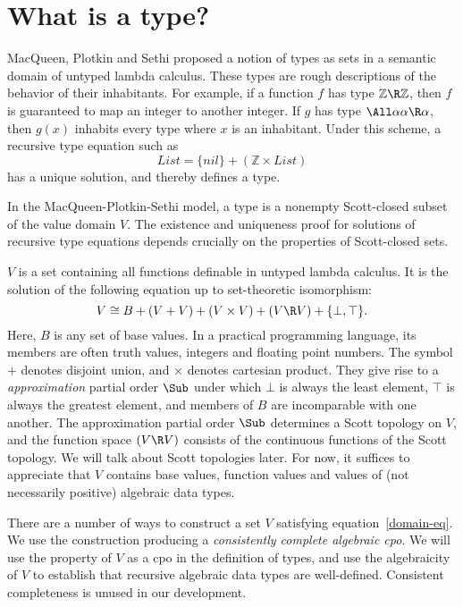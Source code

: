\appendix

\section{What is a type?}

MacQueen, Plotkin and Sethi proposed a notion of types as sets in
a semantic domain of untyped lambda calculus. These types are
rough descriptions of the behavior of their inhabitants. For
example, if a function $f$ has type $\mathbb Z\R\mathbb Z$, then
$f$ is guaranteed to map an integer to another integer. If $g$
has type $\All\alpha \alpha\R\alpha$, then $g(x)$ inhabits every
type where $x$ is an inhabitant. Under this scheme, a recursive
type equation such as
\[
\mathit{List} = \{\mathit{nil}\} + (\mathbb Z \times \mathit{List})
\]
has a unique solution, and thereby defines a type.

In the MacQueen-Plotkin-Sethi model, a type is a nonempty
Scott-closed subset of the value domain $V$. The existence and
uniqueness proof for solutions of recursive type equations
depends crucially on the properties of Scott-closed sets.



$V$ is a set containing all functions definable in untyped lambda
calculus. It is the solution of the following equation up to
set-theoretic isomorphism:
\begin{equation}\label{domain-eq}
V \cong B + (V + V) + (V \times V) + (V \R V) + \{\bot, \top\}.
\end{equation}
Here, $B$ is any set of base values. In a practical programming
language, its members are often truth values, integers and
floating point numbers. The symbol $+$ denotes disjoint union,
and $\times$ denotes cartesian product. They give rise to a
\emph{approximation} partial order $\Sub$ under which $\bot$ is
always the least element, $\top$ is always the greatest element,
and members of $B$ are incomparable with one another. The
approximation partial order $\Sub$ determines a Scott topology on
$V$, and the function space $(V \R V)$ consists of the continuous
functions of the Scott topology. We will talk about Scott
topologies later. For now, it suffices to appreciate that $V$
contains base values, function values and values of (not
necessarily positive) algebraic data types.

There are a number of ways to construct a set $V$ satisfying
equation~\eqref{domain-eq}. We use the construction producing a
\emph{consistently complete algebraic cpo}. We will use the
property of $V$ as a cpo in the definition of types, and use the
algebraicity of $V$ to establish that recursive algebraic data
types are well-defined. Consistent completeness is unused in our
development.

